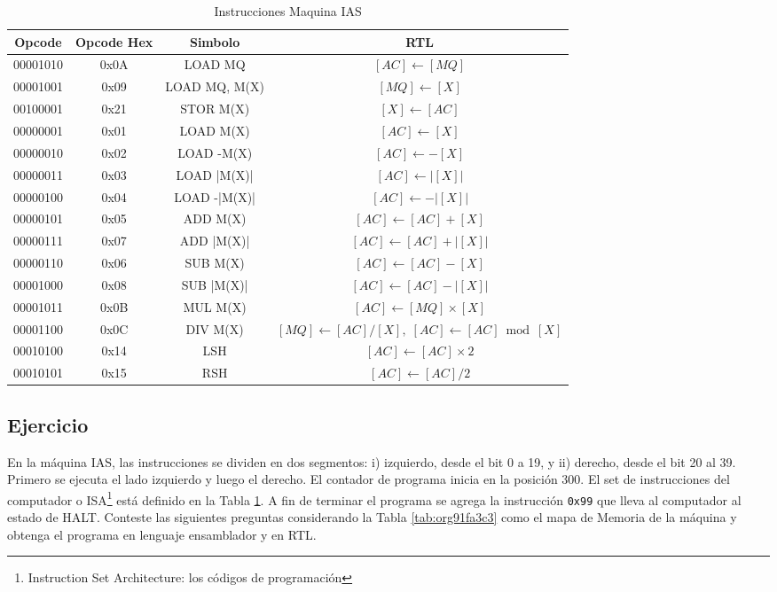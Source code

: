 \documentclass{article}
\begin{document}
\begin{table}[htbp]
  \caption{Instrucciones Maquina IAS}
  \label{tab:tablaISA-IAS}
  \centering
  \begin{tabular}{|cccc|}
    \hline
    Opcode   & Opcode Hex &  Simbolo          & RTL \\ \hline
    00001010 & 0x0A       &  LOAD MQ          & $[AC]\leftarrow[MQ]$\\
    00001001 & 0x09       &  LOAD MQ, M(X)    & $[MQ]\leftarrow[X]$\\
    00100001 & 0x21       &  STOR M(X)        & $[X]\leftarrow[AC]$\\
    00000001 & 0x01       &  LOAD M(X)        & $[AC]\leftarrow[X]$\\
    00000010 & 0x02       &  LOAD -M(X)       & $[AC]\leftarrow-[X]$\\
    00000011 & 0x03       &  LOAD |M(X)|      & $[AC]\leftarrow|[X]|$\\
    00000100 & 0x04       &  LOAD -|M(X)|     & $[AC]\leftarrow-|[X]|$\\
    00000101 & 0x05       &  ADD M(X)         & $[AC]\leftarrow[AC]+[X]$\\
    00000111 & 0x07       &  ADD |M(X)|       & $[AC]\leftarrow[AC]+|[X]|$\\
    00000110 & 0x06       &  SUB M(X)         & $[AC]\leftarrow[AC]-[X]$\\
    00001000 & 0x08       &  SUB |M(X)|       & $[AC]\leftarrow[AC]-|[X]|$\\
    00001011 & 0x0B       & MUL M(X)          & $[AC]\leftarrow[MQ]\times[X]$\\
    00001100 & 0x0C       & DIV M(X)          & $[MQ]\leftarrow[AC]/[X],\;[AC]\leftarrow[AC]\bmod[X]$\\
    00010100 & 0x14       &  LSH              & $[AC]\leftarrow[AC]\times2$\\
    00010101 & 0x15       &  RSH              & $[AC]\leftarrow[AC]/2$\\
    \hline
    
  \end{tabular}
\end{table}

\newpage
\subsection{Ejercicio}
\label{sec:org5c948bc}

En la máquina IAS, las instrucciones se dividen en dos segmentos:
i) izquierdo, desde el bit 0 a 19, y ii) derecho, desde el bit 20 al 39. Primero
se ejecuta el lado izquierdo y  luego el derecho. El
contador de programa inicia en la posición 300. El set de
instrucciones del computador o ISA\footnote{Instruction Set Architecture: los códigos de programación} está definido en la Tabla
\ref{tab:tablaISA-IAS}. A fin de terminar el programa se agrega la
instrucción \texttt{0x99} que lleva al computador al estado de HALT. Conteste las
siguientes preguntas considerando la Tabla \ref{tab:org91fa3c3} como el
mapa de Memoria de la máquina y obtenga el programa en lenguaje ensamblador y en
RTL. 
\end{document}
